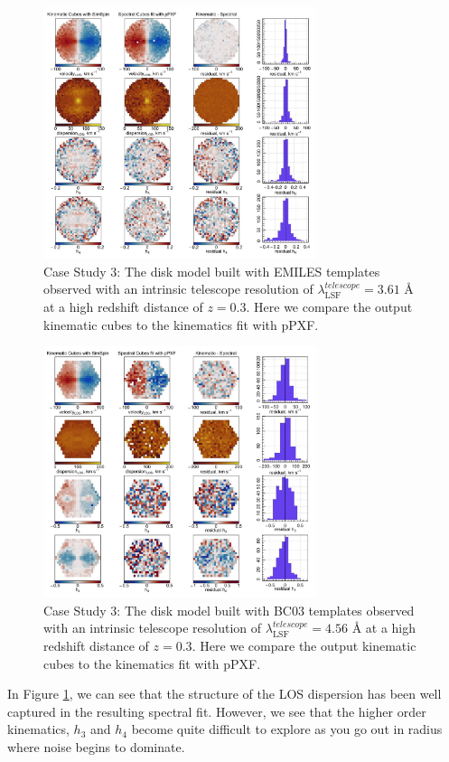 \documentclass[
  journal=pasa,
  manuscript=research-paper, %
  year=2020,
  volume=37,
]{cup-journal}
\begin{document}
\begin{figure}
    \centering
    \includegraphics[keepaspectratio, width=8cm]{Figures/cs3_disk_velocities_highz_fwhm_EMILES.jpeg}
    \caption{Case Study 3: The disk model built with EMILES templates observed with an intrinsic telescope resolution of  $\lambda_{\text{LSF}}^{telescope} = 3.61$ \AA{} at a high redshift distance of $z = 0.3$. Here we compare the output kinematic cubes to the kinematics fit with pPXF.}
    \label{fig:cs3_disk_highz_EMILES}
\end{figure}

\begin{figure}
    \centering
    \includegraphics[keepaspectratio, width=8cm]{Figures/cs3_disk_velocities_highz_fwhm_BC03.jpeg}
    \caption{Case Study 3: The disk model built with BC03 templates observed with an intrinsic telescope resolution of  $\lambda_{\text{LSF}}^{telescope} = 4.56$ \AA{} at a high redshift distance of $z = 0.3$. Here we compare the output kinematic cubes to the kinematics fit with pPXF.}
    \label{fig:cs3_disk_highz_BC03}
\end{figure}

In Figure \ref{fig:cs3_disk_highz_EMILES}, we can see that the structure of the LOS dispersion has been well captured in the resulting spectral fit. 
However, we see that the higher order kinematics, $h_3$ and $h_4$ become quite difficult to explore as you go out in radius where noise begins to dominate.
\end{document}
